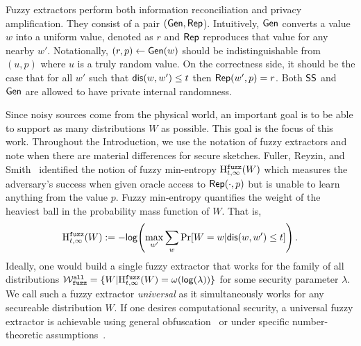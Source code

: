   Fuzzy extractors perform both information reconciliation and privacy amplification.  They consist of a pair $({\mathsf{Gen}}, {\mathsf{Rep}}$).  Intuitively, ${\mathsf{Gen}}$ converts a value $w$ into a uniform value, denoted as $r$ and ${\mathsf{Rep}}$ reproduces that value for any nearby $w'$.  Notationally, $(r, p)\leftarrow {\ensuremath{\mathsf{Gen}}}(w)$ should be indistinguishable from $(u, p)$ where $u$ is a truly random value.  On the correctness side, it should be the case that for all $w'$ such that $\mathsf{dis}(w, w')\le t$ then ${\mathsf{Rep}}(w', p) =r$.  
  Both ${\mathsf{SS}}$ and ${\mathsf{Gen}}$ are allowed to have private internal randomness.  
  
  
Since noisy sources come from the physical world, an important goal
  is to be able to support as many distributions $W$ as possible. This goal is the focus of this work. 
  Throughout the Introduction, we use the notation of fuzzy extractors
  and note when there are material differences for secure sketches.
  Fuller, Reyzin, and Smith~\cite{fuller2016fuzzy,fuller2020fuzzy}
  identified the notion of fuzzy min-entropy $\mathrm{H}^{\mathtt{fuzz}}_{t,\infty}(W)$ which
  measures the adversary's success when given oracle access to
  ${\mathsf{Rep}}(\cdot, p)$ but is unable to learn anything from the value $p$.
Fuzzy min-entropy quantifies the weight of the heaviest ball
  in the probability mass function of $W$.  That is,
\[
\mathrm{H}^{\mathtt{fuzz}}_{t,\infty}(W):= -\mathsf{log}\!\left(\max_{w'} \sum_{w } \Pr[W=w | \mathsf{dis}(w, w')\le t]\right).
\]Ideally, one would build a single fuzzy extractor that works for the family of all distributions $\mathcal{W}_{\mathtt{fuzz}}^{\mathtt{all}} = \{ W | \mathrm{H}^{\mathtt{fuzz}}_{t,\infty}(W) = \omega(\mathsf{log}\!\left(\lambda\right))\}$ for some security parameter $\lambda$.  We call such a fuzzy extractor \emph{universal} as it simultaneously works for any secureable distribution $W$. 
If one desires computational security, a universal fuzzy extractor is achievable using general obfuscation~\cite{BarakBCKPS13,BitanskyCKP14,bitansky2017virtual} or under specific number-theoretic assumptions~\cite{galbraith2019obfuscated}. 


